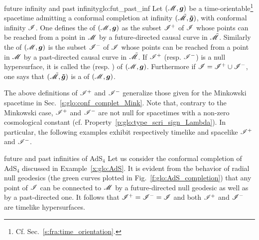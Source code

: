 \begin{tdef}{future infinity and past infinity}{glo:fut_past_inf}
Let $(\mathscr{M},\bm{g})$ be a time-orientable\footnote{Cf. Sec.~\ref{s:fra:time_orientation}.} spacetime admitting a conformal completion at infinity $(\tilde{\mathscr{M}},\bm{\tilde{g}})$, with conformal infinity $\mathscr{I}$.
One defines the  of $(\mathscr{M},\bm{g})$ as the subset $\mathscr{I}^+$ of $\mathscr{I}$ whose points can be reached from a point in $\mathscr{M}$ by a future-directed causal curve in $\tilde{\mathscr{M}}$.
Similarly the   of $(\mathscr{M},\bm{g})$ is the subset $\mathscr{I}^-$ of
$\mathscr{I}$ whose points can be reached from a point in $\mathscr{M}$ by a past-directed causal curve in $\tilde{\mathscr{M}}$.
If $\mathscr{I}^+$ (resp. $\mathscr{I}^-$) is a null hypersurface, it is called the
(resp. )
of $(\mathscr{M},\bm{g})$.
Furthermore if $\mathscr{I} = \mathscr{I}^+ \cup \mathscr{I}^-$, one says that $(\tilde{\mathscr{M}},\bm{\tilde{g}})$ is a
of $(\mathscr{M},\bm{g})$.
\end{tdef}


\begin{remark}
The above definitions of $\mathscr{I}^+$ and $\mathscr{I}^-$
generalize those given for the Minkowski spacetime in Sec.~\ref{s:glo:conf_complet_Mink}.
Note that, contrary to the Minkowski case, $\mathscr{I}^+$ and $\mathscr{I}^-$ are not null
for spacetimes with a non-zero cosmological constant (cf. Property~\ref{p:glo:type_scri_sign_Lambda}).
In particular, the following
examples exhibit respectively timelike and spacelike $\mathscr{I}^+$ and $\mathscr{I}^-$.
\end{remark}

\begin{texample}{future and past infinities of AdS$_{4}$}{}
Let us consider the conformal completion of AdS$_{4}$ discussed in Example~\ref{x:glo:AdS}.
It is evident from the behavior of radial null geodesics (the green curves plotted in Fig.~\ref{f:glo:AdS_completion}) that any point of $\mathscr{I}$ can be connected to $\mathscr{M}$ by a
future-directed null geodesic as well as by a past-directed one. It follows that
$\mathscr{I}^+ = \mathscr{I}^- = \mathscr{I}$ and both $\mathscr{I}^+$ and $\mathscr{I}^-$ are timelike hypersurfaces.
\end{texample}

